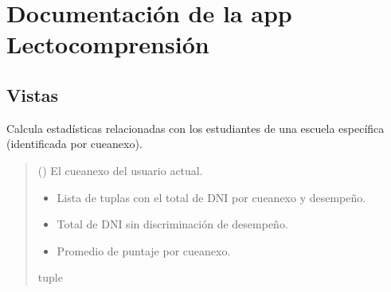 \documentclass[letterpaper,10pt,spanish]{sphinxmanual}
\begin{document}
\sphinxstepscope


\chapter{Documentación de la app Lectocomprensión}
\label{\detokenize{lectocomp:documentacion-de-la-app-lectocomprension}}\label{\detokenize{lectocomp::doc}}

\section{Vistas}
\label{\detokenize{lectocomp:vistas}}

\begin{fulllineitems}

\pysigstartsignatures
{}
\pysigstopsignatures
\sphinxAtStartPar
Calcula estadísticas relacionadas con los estudiantes de una escuela específica (identificada por cueanexo).
\begin{quote}\begin{description}
\sphinxAtStartPar
{} () \textendash{} El cueanexo del usuario actual.

\sphinxAtStartPar
\begin{description}
\begin{itemize}
\item {} 
\sphinxAtStartPar
Lista de tuplas con el total de DNI por cueanexo y desempeño.

\item {} 
\sphinxAtStartPar
Total de DNI sin discriminación de desempeño.

\item {} 
\sphinxAtStartPar
Promedio de puntaje por cueanexo.

\end{itemize}

\end{description}


\sphinxAtStartPar
tuple

\end{description}\end{quote}

\end{fulllineitems}
\end{document}
